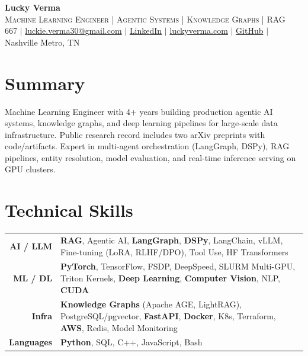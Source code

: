 \documentclass[letterpaper,10pt]{article}
\begin{document}
\begin{center}
    {\fontsize{24}{30}\selectfont\bfseries Lucky Verma} \\ \vspace{2pt}
    {\small\textsc{Machine Learning Engineer | Agentic Systems | Knowledge Graphs | RAG}} \\ \vspace{3pt}
    \small
    667 $|$
    \href{mailto:luckie.verma30@gmail.com}{luckie.verma30@gmail.com} $|$
    \href{https://linkedin.com/in/lucky-verma}{LinkedIn} $|$
    \href{https://luckyverma.com}{luckyverma.com} $|$
    \href{https://github.com/lucky-verma}{GitHub} $|$
    Nashville Metro, TN
\end{center}

\section{Summary}
\vspace{1pt}
\small{
Machine Learning Engineer with 4+ years building production agentic AI systems, knowledge graphs, and deep learning pipelines for large-scale data infrastructure. Public research record includes two arXiv preprints with code/artifacts. Expert in multi-agent orchestration (LangGraph, DSPy), RAG pipelines, entity resolution, model evaluation, and real-time inference serving on GPU clusters.
}

\section{Technical Skills}

\vspace{2pt}
\begin{tabularx}{\textwidth}{r X}
  \small\textbf{AI / LLM} & \small \textbf{RAG}, Agentic AI, \textbf{LangGraph}, \textbf{DSPy}, LangChain, vLLM, Fine-tuning (LoRA, RLHF/DPO), Tool Use, HF Transformers \\
  \small\textbf{ML / DL} & \small \textbf{PyTorch}, TensorFlow, FSDP, DeepSpeed, SLURM Multi-GPU, Triton Kernels, \textbf{Deep Learning}, \textbf{Computer Vision}, NLP, \textbf{CUDA} \\
  \small\textbf{Infra} & \small \textbf{Knowledge Graphs} (Apache AGE, LightRAG), PostgreSQL/pgvector, \textbf{FastAPI}, \textbf{Docker}, K8s, Terraform, \textbf{AWS}, Redis, Model Monitoring \\
  \small\textbf{Languages} & \small \textbf{Python}, SQL, C++, JavaScript, Bash \\
\end{tabularx}
\end{document}
